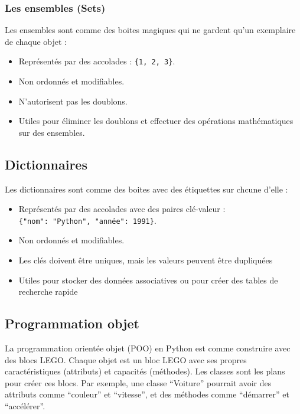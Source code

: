 \documentclass[11pt]{article}
\begin{document}
\hypertarget{les-ensembles-sets}{%
\subsubsection{Les ensembles (Sets)}\label{les-ensembles-sets}}

Les ensembles sont comme des boites magiques qui ne gardent qu'un
exemplaire de chaque objet :

\begin{itemize}
\item
  Représentés par des accolades : \texttt{\{1,\ 2,\ 3\}}.
\item
  Non ordonnés et modifiables.
\item
  N'autorisent pas les doublons.
\item
  Utiles pour éliminer les doublons et effectuer des opérations
  mathématiques sur des ensembles.
\end{itemize}

\hypertarget{dictionnaires}{%
\subsection{Dictionnaires}\label{dictionnaires}}

Les dictionnaires sont comme des boites avec des étiquettes sur chcune
d'elle :

\begin{itemize}
\item
  Représentés par des accolades avec des paires clé-valeur :
  \texttt{\{"nom":\ "Python",\ "année":\ 1991\}}.
\item
  Non ordonnés et modifiables.
\item
  Les clés doivent être uniques, mais les valeurs peuvent être
  dupliquées
\item
  Utiles pour stocker des données associatives ou pour créer des tables
  de recherche rapide
\end{itemize}

\hypertarget{programmation-objet}{%
\subsection{Programmation objet}\label{programmation-objet}}

La programmation orientée objet (POO) en Python est comme construire
avec des blocs LEGO. Chaque objet est un bloc LEGO avec ses propres
caractéristiques (attributs) et capacités (méthodes). Les classes sont
les plans pour créer ces blocs. Par exemple, une classe ``Voiture''
pourrait avoir des attributs comme ``couleur'' et ``vitesse'', et des
méthodes comme ``démarrer'' et ``accélérer''.
\end{document}
